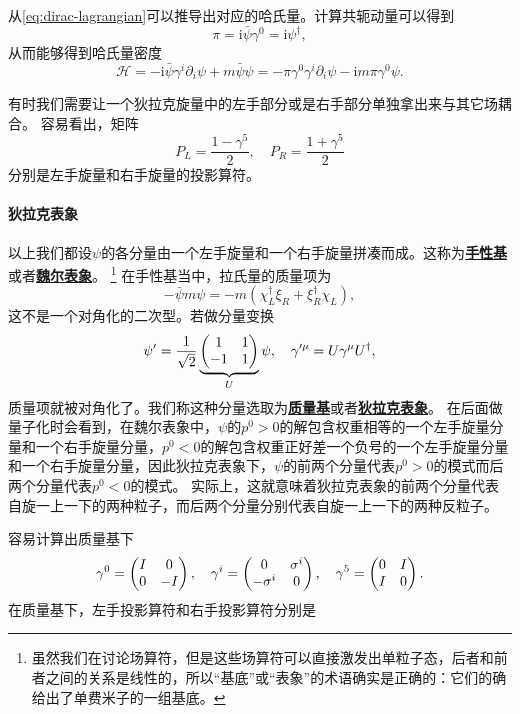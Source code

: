 \documentclass[hyperref, UTF8, a4paper]{ctexart}
\newcommand*{\ii}{\mathrm{i}}
\newcommand{\concept}[1]{\underline{\textbf{#1}}}
\begin{document}
从\eqref{eq:dirac-lagrangian}可以推导出对应的哈氏量。计算共轭动量可以得到
\begin{equation}
    \pi = \ii \bar{\psi} \gamma^0 = \ii \psi^\dagger,
\end{equation}
从而能够得到哈氏量密度
\begin{equation}
    \mathcal{H} = - \ii \bar{\psi} \gamma^i \partial_i \psi  + m \bar{\psi} \psi = - \pi \gamma^0 \gamma^i \partial_i \psi - \ii m \pi \gamma^0 \psi.
    \label{eq:dirac-hamiltonian}
\end{equation}

有时我们需要让一个狄拉克旋量中的左手部分或是右手部分单独拿出来与其它场耦合。
容易看出，矩阵
\begin{equation}
    P_L = \frac{1 - \gamma^5}{2}, \quad P_R = \frac{1 + \gamma^5}{2}
\end{equation}
分别是左手旋量和右手旋量的投影算符。

\paragraph{狄拉克表象} 以上我们都设$\psi$的各分量由一个左手旋量和一个右手旋量拼凑而成。这称为\concept{手性基}或者\concept{魏尔表象}。%
\footnote{
    虽然我们在讨论场算符，但是这些场算符可以直接激发出单粒子态，后者和前者之间的关系是线性的，所以“基底”或“表象”的术语确实是正确的：它们的确给出了单费米子的一组基底。
}%
在手性基当中，拉氏量的质量项为
\[
    - \bar{\psi} m \psi = - m (\chi_L^\dagger \xi_R + \xi_R^\dagger \chi_L),
\]
这不是一个对角化的二次型。若做分量变换
\begin{equation}
    \psi' = \frac{1}{\sqrt{2}} \underbrace{\pmqty{1 & 1 \\ -1 & 1}}_{U} \psi, \quad \gamma'^\mu = U \gamma^\mu U^\dagger,
\end{equation}
质量项就被对角化了。我们称这种分量选取为\concept{质量基}或者\concept{狄拉克表象}。
在后面做量子化时会看到，在魏尔表象中，$\psi$的$p^0 > 0$的解包含权重相等的一个左手旋量分量和一个右手旋量分量，$p^0 < 0$的解包含权重正好差一个负号的一个左手旋量分量和一个右手旋量分量，因此狄拉克表象下，$\psi$的前两个分量代表$p^0 > 0$的模式而后两个分量代表$p^0 < 0$的模式。
实际上，这就意味着狄拉克表象的前两个分量代表自旋一上一下的两种粒子，而后两个分量分别代表自旋一上一下的两种反粒子。

容易计算出质量基下
\begin{equation}
    \gamma^0 = \pmqty{I & 0 \\ 0 & -I}, \quad \gamma^i = \pmqty{0 & \sigma^i \\ - \sigma^i & 0 }, \quad \gamma^5 = \pmqty{0 & I \\ I & 0}.
\end{equation}
在质量基下，左手投影算符和右手投影算符分别是
\end{document}
